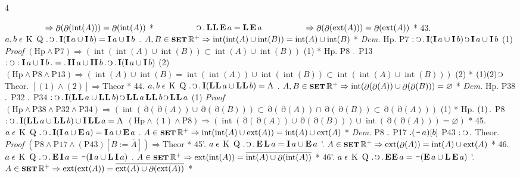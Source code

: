 \documentclass{book}
\newcommand{\s}{\switchcolumn} %
\newcommand{\C}{\mathop{\sbox0{$\displaystyle$$\reflectbox{C}$} %
\raisebox{-\height+\ht0-0.05cm}[\ht0][\dp0]{\scalebox{0.8}[0.8]{\copy0}}}\displaylimits} %
\newcommand{\p}{\mathop{\sbox0{$\displaystyle$$.$}
\raisebox{-\height+\ht0}[\ht0][\dp0]{\scalebox{1}[1]{\copy0}}}\displaylimits} %
\newcommand{\no}{\mathop{\thinspace \scalebox{1.5}{-}}}
\newcommand{\abs}{\mathop{\rotatebox[origin=c]{180}{V}}}
\newcommand{\smallIn}{\ensuremath{\mathrel{\epsilon}}}
\newcommand{\I}{\mathop{\textbf{I}}}
\newcommand{\E}{\mathop{\textbf{E}}}
\newcommand{\Lfat}{\mathop{\textbf{L}}}
\newcommand{\K}{\mathop{\thinspace \text{K} \thinspace}}
\newcommand{\Q}{\mathop{\thinspace \text{Q} \thinspace}}
\newcommand{\II}{\mathop{\textbf{I\hspace{0.02cm}I}}}
\newcommand{\EE}{\mathop{\textbf{E\hspace{0.02cm}E}}}
\newcommand{\LfatLfat}{\mathop{\textbf{L\hspace{0.02cm}L}}}
\newcommand{\setOfSets}{\mathop{\text{{\footnotesize \textbf{SET}}}}}
\renewcommand{\rightarrow}{\Rightarrow}
\DeclareMathOperator{\interior}{int}
\DeclareMathOperator{\exterior}{ext}
\DeclareMathOperator{\boundary}{\partial}
\newenvironment{translateFourCol}[4]
               { %
                 \setcolumnwidth{#1\fill/1em, #2\fill/\columnsep, #3\fill/1em, #4\fill}
                 \begin{paracol}{4}
                 \newcommand{\LAT}{\switchcolumn[0]*}
                 \newcommand{\ENG}{\switchcolumn[2]}
               }
               { %
                 \let\ENG\undefined
                 \let\LAT\undefined
                 \end{paracol}
               }
\begin{document}
\begin{translateFourCol}{0.08}{0.42}{0.08}{0.42}
\ENG
\s $\hspace{1.68cm} \rightarrow \boundary(\boundary(\interior(A))) = \boundary(\interior(A))$
\LAT
\s $\hspace{1.68cm} \C \p \LfatLfat\E a = \Lfat\E a$
\ENG
\s $\hspace{1.68cm} \rightarrow \boundary(\boundary(\exterior(A))) = \boundary(\exterior(A))$
\LAT
43. \s $a,b \smallIn \K \Q \p \C \p \I (\I a \cup \I b) = \I a \cup \I b$
\ENG
43. \s $A,B \in \setOfSets \mathbb{R}^+ \rightarrow \interior(\interior(A) \cup \interior(B)) = \interior(A) \cup \interior(B)$
\LAT
\emph{Dem.} \s Hp. P7 $: \C \p \I (\I a \cup \I b) \C \I a \cup \I b$ \hfill (1)
\ENG
\emph{Proof} \s $(\text{Hp} \wedge \text{P7}) \rightarrow (\interior(\interior(A) \cup \interior(B)) \subset \interior(A) \cup \interior(B))$ \hfill (1)
\LAT
\s Hp. P8 $\p$ P13 $: \C : \I a \cup \I b \p = \p \II a \cup \II b \p \C \p \I (\I a \cup \I b)$ \hfill (2)
\ENG
\s $(\text{Hp} \wedge \text{P8} \wedge \text{P13}) \rightarrow (\interior(A) \cup \interior(B) = \interior(\interior(A)) \cup \interior(\interior(B)) \subset \interior(\interior(A) \cup \interior(B)))$ \hfill (2)
\LAT
\s $(1)(2) \C$ Theor.
\ENG
\s $[(1) \wedge (2)] \rightarrow \text{Theor}$
\LAT
44. \s $a,b \smallIn \K \Q \p \C \p \I (\LfatLfat a \cup \LfatLfat b) = \abs$
\ENG
44. \s $A,B \in \setOfSets \mathbb{R}^+ \rightarrow \interior(\boundary(\boundary(A)) \cup \boundary(\boundary(B))) = \varnothing$
\LAT
\emph{Dem.} \s Hp. P38 $\p$ P32 $\p$ P34 $: \C \p \I (\LfatLfat a \cup \LfatLfat b) \C \LfatLfat a \LfatLfat b \C \LfatLfat a$ \hfill (1)
\ENG
\emph{Proof} \s $(\text{Hp} \wedge \text{P38} \wedge \text{P32} \wedge \text{P34}) \rightarrow (\interior(\boundary(\boundary(A)) \cup \boundary(\boundary(B))) \subset \boundary(\boundary(A)) \cap \boundary(\boundary(B)) \subset \boundary(\boundary(A)))$ \hfill (1)
\LAT
\s Hp. $(1) \p$ P8 $: \C \p \I (\LfatLfat a \cup \LfatLfat b) \cup \I \LfatLfat a = \abs$
\ENG
\s $(\text{Hp} \wedge (1) \wedge \text{P8}) \rightarrow (\interior(\boundary(\boundary(A)) \cup \boundary(\boundary(B))) \cup \interior(\boundary(\boundary(A))) = \varnothing)$
\LAT
45. \s $a \smallIn \K \Q \p \C \p \I (\I a \cup \E a) = \I a \cup \E a$
\ENG
45. \s $A \in \setOfSets \mathbb{R}^+ \rightarrow \interior(\interior(A) \cup \exterior(A)) = \interior(A) \cup \exterior(A)$
\LAT
\emph{Dem.} \s P8 $\p$ P17 $\p (\no a) [b]$ P43 $: \C \p$ Theor.
\ENG
\emph{Proof} \s $(\text{P8} \wedge \text{P17} \wedge (\text{P43})[B:=\overline{A}]) \rightarrow \text{Theor}$
\LAT
45'. \s $a \smallIn \K \Q \p \C \p \E\Lfat a = \I a \cup \E a$
\ENG
45'. \s $A \in \setOfSets \mathbb{R}^+ \rightarrow \exterior(\boundary(A)) = \interior(A) \cup \exterior(A)$
\LAT
46. \s $a \smallIn \K \Q \p \C \p \E\I a = \no (\I a \cup \Lfat\I a)$
\ENG
46. \s $A \in \setOfSets \mathbb{R}^+ \rightarrow \exterior(\interior(A)) = \overline{\interior(A) \cup \boundary(\interior(A))}$
\LAT
46'. \s $a \smallIn \K \Q \p \C \p \EE a = \no (\E a \cup \Lfat\E a)$
\ENG
46'. \s $A \in \setOfSets \mathbb{R}^+ \rightarrow \exterior(\exterior(A)) = \overline{\exterior(A) \cup \boundary(\exterior(A))}$
\LAT
\end{translateFourCol}
\end{document}
